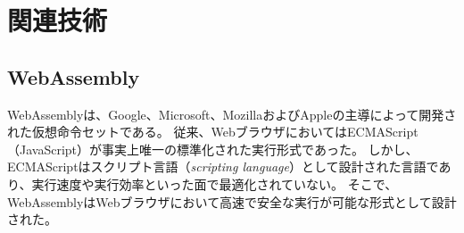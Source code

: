 \chapter{関連技術}
\label{chap:related_works}

\section{WebAssembly}

WebAssemblyは、Google、Microsoft、MozillaおよびAppleの主導によって開発された仮想命令セットである\cite{webassembly}。
従来、WebブラウザにおいてはECMAScript（JavaScript）が事実上唯一の標準化された実行形式であった。
しかし、ECMAScriptはスクリプト言語（{\it scripting language}）として設計された言語であり\cite{ecma2018}、実行速度や実行効率といった面で最適化されていない。
そこで、WebAssemblyはWebブラウザにおいて高速で安全な実行が可能な形式として設計された。
